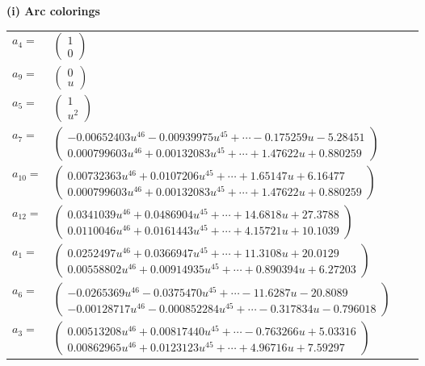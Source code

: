 \documentclass[1p]{elsarticle_modified}
\theoremstyle{definition}
\begin{document}
\flushleft \textbf{(i) Arc colorings}\\
\begin{tabular}{m{7pt} m{180pt} m{7pt} m{180pt} }
\flushright $a_{4}=$&$\begin{pmatrix}1\\0\end{pmatrix}$ \\
\flushright $a_{9}=$&$\begin{pmatrix}0\\u\end{pmatrix}$ \\
\flushright $a_{5}=$&$\begin{pmatrix}1\\u^2\end{pmatrix}$ \\
\flushright $a_{7}=$&$\begin{pmatrix}-0.00652403 u^{46}-0.00939975 u^{45}+\cdots-0.175259 u-5.28451\\0.000799603 u^{46}+0.00132083 u^{45}+\cdots+1.47622 u+0.880259\end{pmatrix}$ \\
\flushright $a_{10}=$&$\begin{pmatrix}0.00732363 u^{46}+0.0107206 u^{45}+\cdots+1.65147 u+6.16477\\0.000799603 u^{46}+0.00132083 u^{45}+\cdots+1.47622 u+0.880259\end{pmatrix}$ \\
\flushright $a_{12}=$&$\begin{pmatrix}0.0341039 u^{46}+0.0486904 u^{45}+\cdots+14.6818 u+27.3788\\0.0110046 u^{46}+0.0161443 u^{45}+\cdots+4.15721 u+10.1039\end{pmatrix}$ \\
\flushright $a_{1}=$&$\begin{pmatrix}0.0252497 u^{46}+0.0366947 u^{45}+\cdots+11.3108 u+20.0129\\0.00558802 u^{46}+0.00914935 u^{45}+\cdots+0.890394 u+6.27203\end{pmatrix}$ \\
\flushright $a_{6}=$&$\begin{pmatrix}-0.0265369 u^{46}-0.0375470 u^{45}+\cdots-11.6287 u-20.8089\\-0.00128717 u^{46}-0.000852284 u^{45}+\cdots-0.317834 u-0.796018\end{pmatrix}$ \\
\flushright $a_{3}=$&$\begin{pmatrix}0.00513208 u^{46}+0.00817440 u^{45}+\cdots-0.763266 u+5.03316\\0.00862965 u^{46}+0.0123123 u^{45}+\cdots+4.96716 u+7.59297\end{pmatrix}$ \\

\end{tabular}
\end{document}
